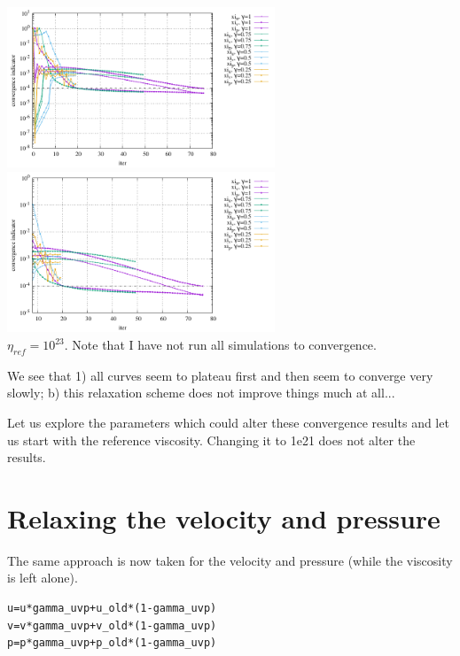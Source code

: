 \begin{center}
\includegraphics[width=8cm]{python_codes/fieldstone_50/results/conv_eta.pdf}
\includegraphics[width=8cm]{python_codes/fieldstone_50/results/conv_eta_zoom.pdf}\\
{\captionfont $\eta_{ref}=10^{23}$. Note that I have not run all simulations 
to convergence.}
\end{center}

We see that 1) all curves seem to plateau first and then seem to converge very slowly; 
b) this relaxation scheme does not improve things much at all...

Let us explore the parameters which could alter these convergence results
and let us start with the reference viscosity. Changing it to 1e21 does not 
alter the results.  

\section*{Relaxing the velocity and pressure}

The same approach is now taken for the velocity and pressure (while the viscosity is left alone).

\begin{lstlisting}
u=u*gamma_uvp+u_old*(1-gamma_uvp)
v=v*gamma_uvp+v_old*(1-gamma_uvp)
p=p*gamma_uvp+p_old*(1-gamma_uvp)
\end{lstlisting}



